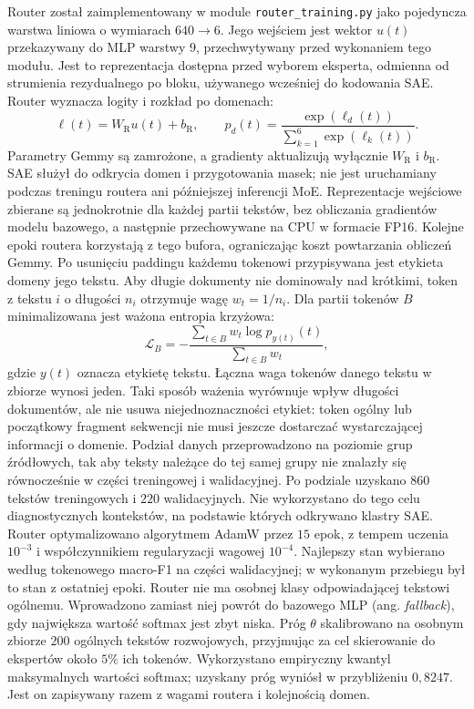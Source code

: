 Router został zaimplementowany w module \texttt{router\_training.py} jako pojedyncza warstwa liniowa o wymiarach $640\rightarrow6$. Jego wejściem jest wektor $u(t)$ przekazywany do MLP warstwy $9$, przechwytywany przed wykonaniem tego modułu. Jest to reprezentacja dostępna przed wyborem eksperta, odmienna od strumienia rezydualnego po bloku, używanego wcześniej do kodowania SAE. Router wyznacza logity i rozkład po domenach:
\[
\ell(t)=W_{\mathrm R}u(t)+b_{\mathrm R},
\qquad
p_d(t)=\frac{\exp(\ell_d(t))}{\sum_{k=1}^{6}\exp(\ell_k(t))}.
\]
Parametry Gemmy są zamrożone, a gradienty aktualizują wyłącznie $W_{\mathrm R}$ i $b_{\mathrm R}$. SAE służył do odkrycia domen i przygotowania masek; nie jest uruchamiany podczas treningu routera ani późniejszej inferencji MoE. \newline
Reprezentacje wejściowe zbierane są jednokrotnie dla każdej partii tekstów, bez obliczania gradientów modelu bazowego, a następnie przechowywane na CPU w formacie FP16. Kolejne epoki routera korzystają z tego bufora, ograniczając koszt powtarzania obliczeń Gemmy. Po usunięciu paddingu każdemu tokenowi przypisywana jest etykieta domeny jego tekstu. Aby długie dokumenty nie dominowały nad krótkimi, token z tekstu $i$ o długości $n_i$ otrzymuje wagę $w_t=1/n_i$. Dla partii tokenów $B$ minimalizowana jest ważona entropia krzyżowa:
\[
\mathcal{L}_B=
-\frac{\sum_{t\in B}w_t\log p_{y(t)}(t)}{\sum_{t\in B}w_t},
\]
gdzie $y(t)$ oznacza etykietę tekstu. Łączna waga tokenów danego tekstu w zbiorze wynosi jeden. Taki sposób ważenia wyrównuje wpływ długości dokumentów, ale nie usuwa niejednoznaczności etykiet: token ogólny lub początkowy fragment sekwencji nie musi jeszcze dostarczać wystarczającej informacji o domenie. \newline
Podział danych przeprowadzono na poziomie grup źródłowych, tak aby teksty należące do tej samej grupy nie znalazły się równocześnie w części treningowej i walidacyjnej. Po podziale uzyskano $860$ tekstów treningowych i $220$ walidacyjnych. Nie wykorzystano do tego celu diagnostycznych kontekstów, na podstawie których odkrywano klastry SAE. Router optymalizowano algorytmem AdamW przez $15$ epok, z tempem uczenia $10^{-3}$ i współczynnikiem regularyzacji wagowej $10^{-4}$. Najlepszy stan wybierano według tokenowego macro-F1 na części walidacyjnej; w wykonanym przebiegu był to stan z ostatniej epoki. \newline
Router nie ma osobnej klasy odpowiadającej tekstowi ogólnemu. Wprowadzono zamiast niej powrót do bazowego MLP (ang. \textit{fallback}), gdy największa wartość softmax jest zbyt niska. Próg $\theta$ skalibrowano na osobnym zbiorze $200$ ogólnych tekstów rozwojowych, przyjmując za cel skierowanie do ekspertów około $5\%$ ich tokenów. Wykorzystano empiryczny kwantyl maksymalnych wartości softmax; uzyskany próg wyniósł w przybliżeniu $0{,}8247$. Jest on zapisywany razem z wagami routera i kolejnością domen. \newline
